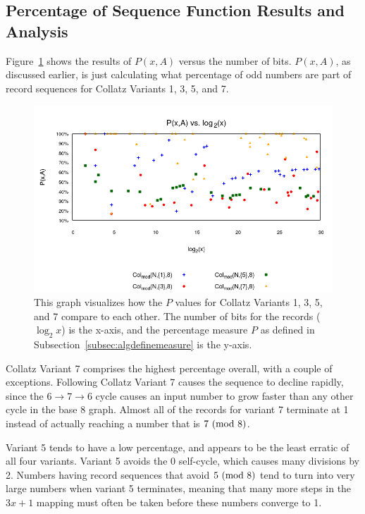 \subsection{Percentage of Sequence Function Results and Analysis} \label{subsubsec:algsinpercentage}
 Figure~\ref{fig:pvslog} shows the results of $P(x,A)$ versus the number of bits. $P(x,A)$, as discussed earlier, is just calculating what percentage of odd numbers are part of record sequences for Collatz Variants 1, 3, 5, and 7. \par
\begin{figure}
    \centering
    \includegraphics[scale=0.6]{ModAvoidanceAnalysisPics/P_vs_log.png}
    \caption{This graph visualizes how the $P$ values for Collatz Variants 1, 3, 5, and 7 compare to each other. The number of bits for the records ($\log_2{x}$) is the x-axis, and the percentage measure $P$ as defined in Subsection~\ref{subsec:algdefinemeasure} is the y-axis.}
    \label{fig:pvslog}
\end{figure}
Collatz Variant 7 comprises the highest percentage overall, with a couple of exceptions. Following Collatz Variant 7 causes the sequence to decline rapidly, since the $6 \rightarrow 7 \rightarrow 6$ cycle causes an input number to grow faster than any other cycle in the base 8 graph. Almost all of the records for variant 7 terminate at 1 instead of actually reaching a number that is $7 \ (\mathrm{mod}\ 8)$. \par
Variant 5 tends to have a low percentage, and appears to be the least erratic of all four variants. Variant 5 avoids the 0 self-cycle, which causes many divisions by 2. Numbers having record sequences that avoid $5 \ (\mathrm{mod}\ 8)$ tend to turn into very large numbers when variant 5 terminates, meaning that many more steps in the $3x+1$ mapping must often be taken before these numbers converge to 1. \par

